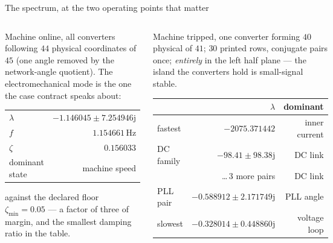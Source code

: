 \documentclass[aspectratio=169,10pt]{beamer}
\begin{document}
\begin{frame}[shrink=6]{The spectrum, at the two operating points that matter}
\begin{columns}[T,onlytextwidth]
\begin{block}{Machine online, all converters following}
\footnotesize
$44$ physical coordinates of $45$ (one angle removed by the network-angle
quotient). The electromechanical mode is the one the case contract speaks about:
\vspace{-0.3em}\begin{center}
\begin{tabular}{lr}\toprule
$\lambda$ & $-1.146045\pm7.254946\mathrm{j}$ \\
$f$ & $1.154661$\,Hz \\
$\zeta$ & $0.156033$ \\
dominant state & machine speed \\
\bottomrule\end{tabular}
\end{center}\vspace{-0.3em}
against the declared floor $\zeta_{\min}=0.05$ --- a factor of three of margin,
and the smallest damping ratio in the table.
\end{block}
\begin{block}{Machine tripped, one converter forming}
\footnotesize
$40$ physical of $41$; $30$ printed rows, conjugate pairs once; \emph{entirely}
in the left half plane --- the island the converters hold is small-signal stable.
\vspace{-0.3em}\begin{center}
\begin{tabular}{lrr}\toprule
 & $\lambda$ & dominant \\ \midrule
fastest & $-2075.371442$ & inner current \\
DC family & $-98.41\pm98.38\mathrm{j}$ & DC link \\
 & \dots\,3 more pairs & DC link \\
PLL pair & $-0.588912\pm2.171749\mathrm{j}$ & PLL angle \\
slowest & $-0.328014\pm0.448860\mathrm{j}$ & voltage loop \\
\bottomrule\end{tabular}
\end{center}

\end{block}
\end{columns}
\end{frame}
\end{document}
